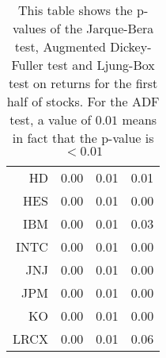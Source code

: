 \begin{table}[ht]
\begin{tabular}{rrrr}
  HD & 0.00 & 0.01 & 0.01 \\ 
  HES & 0.00 & 0.01 & 0.00 \\ 
  IBM & 0.00 & 0.01 & 0.03 \\ 
  INTC & 0.00 & 0.01 & 0.00 \\ 
  JNJ & 0.00 & 0.01 & 0.00 \\ 
  JPM & 0.00 & 0.01 & 0.00 \\ 
  KO & 0.00 & 0.01 & 0.00 \\ 
  LRCX & 0.00 & 0.01 & 0.06 \\ 
   \hline
\end{tabular}
\caption[JB test, ADF test, LB text on returns. (1)]{This table shows the p-values of the Jarque-Bera test, Augmented Dickey-Fuller test and Ljung-Box test 
                     on returns for the first half of stocks. For the ADF test, a value of $0.01$ means in fact that the p-value is $<0.01$} 
\label{Table:Rets_p_vals_1}
\end{table}
